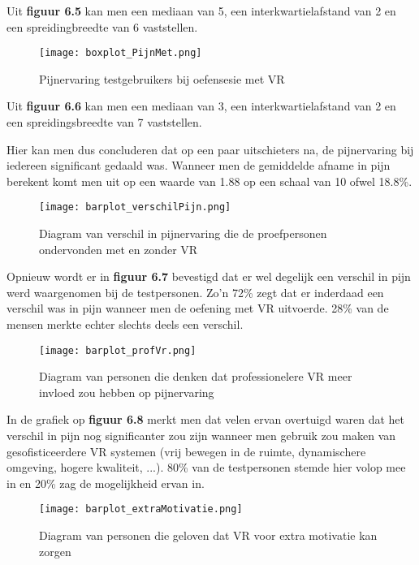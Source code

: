 Uit \textbf{figuur 6.5} kan men een mediaan van 5, een interkwartielafstand van 2 en een spreidingbreedte van 6 vaststellen.

\begin{figure}[h]
    \centering
    \texttt{[image: boxplot\_PijnMet.png]}
    \caption{Pijnervaring testgebruikers bij oefensesie met VR}
    \label{figuur 6.6}
\end{figure}

Uit \textbf{figuur 6.6} kan men een mediaan van 3, een interkwartielafstand van 2 en een spreidingsbreedte van 7 vaststellen.

Hier kan men dus concluderen dat op een paar uitschieters na, de pijnervaring bij iedereen significant gedaald was. Wanneer men de gemiddelde afname in pijn berekent komt men uit op een waarde van 1.88 op een schaal van 10 ofwel 18.8\%.

\begin{figure}[h]
    \centering
    \texttt{[image: barplot\_verschilPijn.png]}
    \caption{Diagram van verschil in pijnervaring die de proefpersonen ondervonden met en zonder VR}
    \label{figuur 6.7}
\end{figure}

\newpage


Opnieuw wordt er in \textbf{figuur 6.7} bevestigd dat er wel degelijk een verschil in pijn werd waargenomen bij de testpersonen. Zo'n 72\% zegt dat er inderdaad een verschil was in pijn wanneer men de oefening met VR uitvoerde. 28\% van de mensen merkte echter slechts deels een verschil.

\begin{figure}[h]
    \centering
    \texttt{[image: barplot\_profVr.png]}
    \caption{Diagram van personen die denken dat professionelere VR meer invloed zou hebben op pijnervaring}
    \label{figuur 6.8}
\end{figure}

In de grafiek op \textbf{figuur 6.8} merkt men dat velen ervan overtuigd waren dat het verschil in pijn nog significanter zou zijn wanneer men gebruik zou maken van gesofisticeerdere VR systemen (vrij bewegen in de ruimte, dynamischere omgeving, hogere kwaliteit, ...). 80\% van de testpersonen stemde hier volop mee in en 20\% zag de mogelijkheid ervan in.

\begin{figure}[h]
    \centering
    \texttt{[image: barplot\_extraMotivatie.png]}
    \caption{Diagram van personen die geloven dat VR voor extra motivatie kan zorgen}
    \label{figuur 6.9}
\end{figure}



